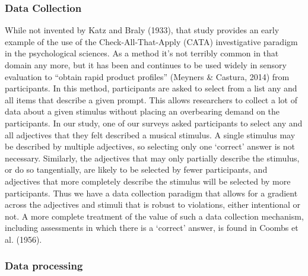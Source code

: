 \documentclass[
  english,
  man,floatsintext]{apa6}
\begin{document}
\hypertarget{data-collection}{%
\subsubsection{Data Collection}\label{data-collection}}

While not invented by Katz and Braly (1933), that study provides an early example of the use of the Check-All-That-Apply (CATA) investigative paradigm in the psychological sciences. As a method it's not terribly common in that domain any more, but it has been and continues to be used widely in sensory evaluation to ``obtain rapid product profiles'' (Meyners \& Castura, 2014) from participants. In this method, participants are asked to select from a list any and all items that describe a given prompt. This allows researchers to collect a lot of data about a given stimulus without placing an overbearing demand on the participants. In our study, one of our surveys asked participants to select any and all adjectives that they felt described a musical stimulus. A single stimulus may be described by multiple adjectives, so selecting only one `correct' answer is not necessary. Similarly, the adjectives that may only partially describe the stimulus, or do so tangentially, are likely to be selected by fewer participants, and adjectives that more completely describe the stimulus will be selected by more participants. Thus we have a data collection paradigm that allows for a gradient across the adjectives and stimuli that is robust to violations, either intentional or not. A more complete treatment of the value of such a data collection mechanism, including assessments in which there is a `correct' answer, is found in Coombs et al. (1956).

\hypertarget{data-processing}{%
\subsubsection{Data processing}\label{data-processing}}
\end{document}
